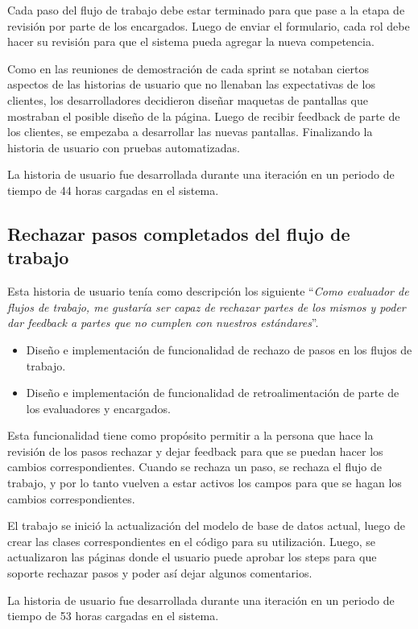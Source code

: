 Cada paso del flujo de trabajo debe estar terminado para que pase a la etapa de revisión por parte de los encargados. Luego de enviar el formulario, cada rol debe hacer su revisión para que el sistema pueda agregar la nueva competencia.

Como en las reuniones de demostración de cada sprint se notaban ciertos aspectos de las historias de usuario que no llenaban las expectativas de los clientes, los desarrolladores decidieron diseñar maquetas de pantallas que mostraban el posible diseño de la página. Luego de recibir feedback de parte de los clientes, se empezaba a desarrollar las nuevas pantallas. Finalizando la historia de usuario con pruebas automatizadas.

La historia de usuario fue desarrollada durante una iteración en un periodo de tiempo de 44 horas cargadas en el sistema.

\subsection{Rechazar pasos completados del flujo de trabajo}
Esta historia de usuario tenía como descripción los siguiente \enquote{\textit{Como evaluador de flujos de trabajo, me gustaría ser capaz de rechazar partes de los mismos y poder dar feedback a partes que no cumplen con nuestros estándares}}.

\begin{itemize}
	\item Diseño e implementación de funcionalidad de rechazo de pasos en los flujos de trabajo.
	\item Diseño e implementación de funcionalidad de retroalimentación de parte de los evaluadores y encargados.
\end{itemize}

Esta funcionalidad tiene como propósito permitir a la persona que hace la revisión de los pasos rechazar y dejar feedback para que se puedan hacer los cambios correspondientes. Cuando se rechaza un paso, se rechaza el flujo de trabajo, y por lo tanto vuelven a estar activos los campos para que se hagan los cambios correspondientes.

El trabajo se inició la actualización del modelo de base de datos actual, luego de crear las clases correspondientes en el código para su utilización. Luego, se actualizaron las páginas donde el usuario puede aprobar los steps para que soporte rechazar pasos y poder así dejar algunos comentarios. 

La historia de usuario fue desarrollada durante una iteración en un periodo de tiempo de 53 horas cargadas en el sistema.
